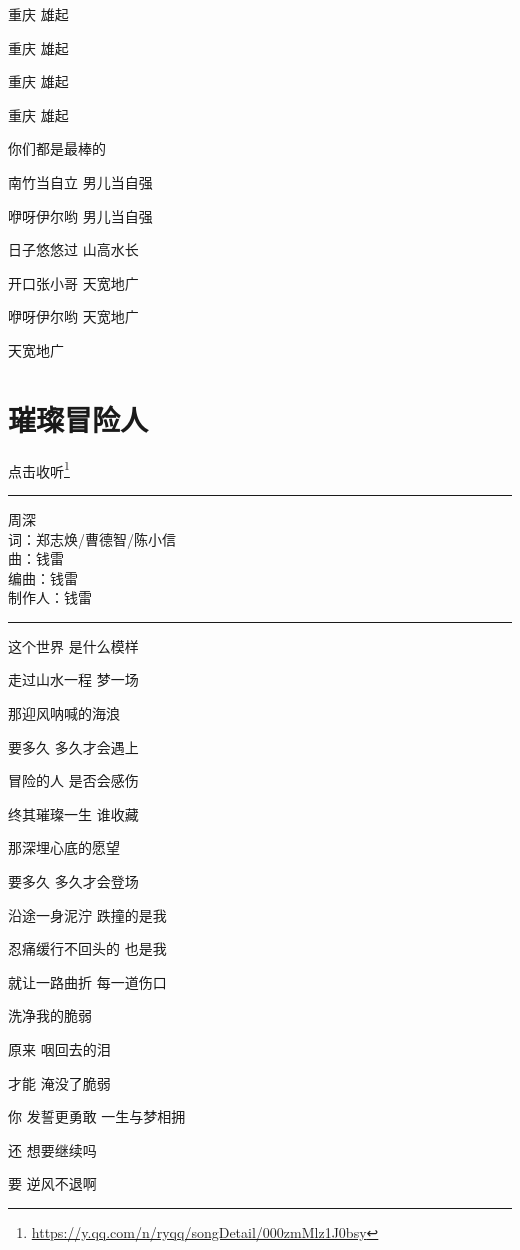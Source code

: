 \documentclass[]{ctexbook}
\renewcommand{\href}[2]{#2\footnote{\url{#1}}}
\begin{document}
重庆 雄起

重庆 雄起

重庆 雄起

重庆 雄起

你们都是最棒的

南竹当自立 男儿当自强

咿呀伊尔哟 男儿当自强

日子悠悠过 山高水长

开口张小哥 天宽地广

咿呀伊尔哟 天宽地广

天宽地广

\section*{璀璨冒险人}\label{adventurers}


\href{https://y.qq.com/n/ryqq/songDetail/000zmMlz1J0bsy}{点击收听}

\begin{center}\rule{0.5\linewidth}{0.5pt}\end{center}

周深\\
词：郑志焕/曹德智/陈小信\\
曲：钱雷\\
编曲：钱雷\\
制作人：钱雷

\begin{center}\rule{0.5\linewidth}{0.5pt}\end{center}

这个世界 是什么模样

走过山水一程 梦一场

那迎风呐喊的海浪

要多久 多久才会遇上

冒险的人 是否会感伤

终其璀璨一生 谁收藏

那深埋心底的愿望

要多久 多久才会登场

沿途一身泥泞 跌撞的是我

忍痛缓行不回头的 也是我

就让一路曲折 每一道伤口

洗净我的脆弱

原来 咽回去的泪

才能 淹没了脆弱

你 发誓更勇敢 一生与梦相拥

还 想要继续吗

要 逆风不退啊
\end{document}
